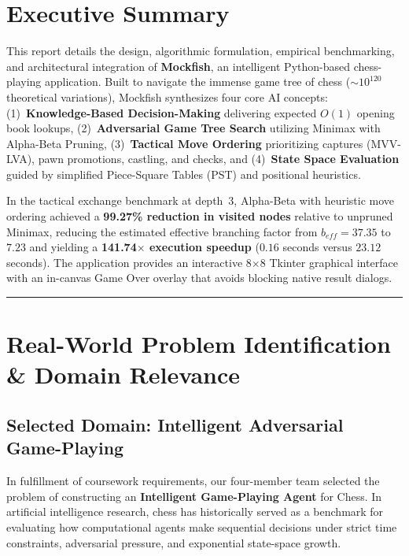 \documentclass[11pt,a4paper]{article}
\begin{document}
\section*{Executive Summary}
This report details the design, algorithmic formulation, empirical benchmarking, and architectural integration of \textbf{Mockfish}, an intelligent Python-based chess-playing application. Built to navigate the immense game tree of chess ($\sim 10^{120}$ theoretical variations), Mockfish synthesizes four core AI concepts: (1)~\textbf{Knowledge-Based Decision-Making} delivering expected $O(1)$ opening book lookups, (2)~\textbf{Adversarial Game Tree Search} utilizing Minimax with Alpha-Beta Pruning, (3)~\textbf{Tactical Move Ordering} prioritizing captures (MVV-LVA), pawn promotions, castling, and checks, and (4)~\textbf{State Space Evaluation} guided by simplified Piece-Square Tables (PST) and positional heuristics.

In the tactical exchange benchmark at depth~3, Alpha-Beta with heuristic move ordering achieved a \textbf{99.27\% reduction in visited nodes} relative to unpruned Minimax, reducing the estimated effective branching factor from $b_{eff}=37.35$ to $7.23$ and yielding a \textbf{141.74$\times$ execution speedup} ($0.16$ seconds versus $23.12$ seconds). The application provides an interactive 8$\times$8 Tkinter graphical interface with an in-canvas Game Over overlay that avoids blocking native result dialogs.
\vspace{0.4cm}
\hrule
\vspace{0.4cm}
\setlength{\cftbeforesecskip}{3pt}
{\small\tableofcontents}
\newpage
{}
\setcounter{page}{1}
\section{Real-World Problem Identification \& Domain Relevance}
\subsection{Selected Domain: Intelligent Adversarial Game-Playing}
In fulfillment of coursework requirements, our four-member team selected the problem of constructing an \textbf{Intelligent Game-Playing Agent} for Chess. In artificial intelligence research, chess has historically served as a benchmark for evaluating how computational agents make sequential decisions under strict time constraints, adversarial pressure, and exponential state-space growth.
\end{document}
